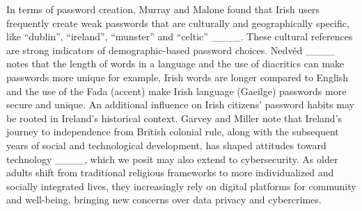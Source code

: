 
In terms of password creation, Murray and Malone found that Irish users frequently create weak passwords that are culturally and geographically specific, like ``dublin'', ``ireland'', ``munster'' and ``celtic'' ____. These cultural references are strong indicators of demographic-based password choices.
Nedvěd ____ notes that the length of words in a language and the use of diacritics can make passwords more unique for example, Irish words are longer compared to English and the use of the Fada (accent) make Irish language (Gaeilge) passwords more secure and unique.
An additional influence on Irish citizens' password habits may be rooted in Ireland's historical context. Garvey and Miller note that Ireland's journey to independence from British colonial rule, along with the subsequent years of social and technological development, has shaped attitudes toward technology ____, which we posit may also extend to cybersecurity. As older adults shift from traditional religious frameworks to more individualized and socially integrated lives, they increasingly rely on digital platforms for community and well-being, bringing new concerns over data privacy and cybercrimes.

